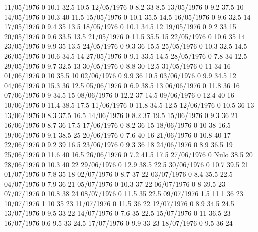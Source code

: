11/05/1976  0      10.1   32.5   10.5 
12/05/1976  0      8.2    33     8.5 
13/05/1976  0      9.2    37.5   10 
14/05/1976  0      10.3   40     11.5 
15/05/1976  0      10.1   35.5   14.5 
16/05/1976  0      9.6    32.5   14 
17/05/1976  0      9.4    35     13.5 
18/05/1976  0      10.1   34.5   12 
19/05/1976  0      9.2    33     15 
20/05/1976  0      9.6    33.5   13.5 
21/05/1976  0      11.5   35.5   15 
22/05/1976  0      10.6   35     14 
23/05/1976  0      9.9    35     13.5 
24/05/1976  0      9.3    36     15.5 
25/05/1976  0      10.3   32.5   14.5 
26/05/1976  0      10.6   34.5   14 
27/05/1976  0      9.1    33.5   14.5 
28/05/1976  0      7.8    34     12.5 
29/05/1976  0      9.7    32.5   13 
30/05/1976  0      8.8    30     12.5 
31/05/1976  0      11     34     16 
01/06/1976  0      10     35.5   10 
02/06/1976  0      9.9    36     10.5 
03/06/1976  0      9.9    34.5   12 
04/06/1976  0      15.3   36     12.5 
05/06/1976  0      6.9    38.5   13 
06/06/1976  0      11.8   36     16 
07/06/1976  0      9      34.5   15 
08/06/1976  0      12.2   37     14.5 
09/06/1976  0      12.4   40     16 
10/06/1976  0      11.4   38.5   17.5 
11/06/1976  0      11.8   34.5   12.5 
12/06/1976  0      10.5   36     13 
13/06/1976  0      8.3    37.5   16.5 
14/06/1976  0      8.2    37     19.5 
15/06/1976  0      9.3    36     21 
16/06/1976  0      8.7    36     17.5 
17/06/1976  0      8.2    36     15 
18/06/1976  0      10     38     16.5 
19/06/1976  0      9.1    38.5   25 
20/06/1976  0      7.6    40     16 
21/06/1976  0      10.8   40     17 
22/06/1976  0      9.2    39     16.5 
23/06/1976  0      9.3    36     18 
24/06/1976  0      8.9    36.5   19 
25/06/1976  0      11.6   40     16.5 
26/06/1976  0      7.2    41.5   17.5 
27/06/1976  0     Nulo    38.5   20 
28/06/1976  0      10.3   40     22 
29/06/1976  0      12.9   38.5   22.5 
30/06/1976  0      10.7   39.5   21 
01/07/1976  0      7.8    35     18 
02/07/1976  0      8.7    37     22 
03/07/1976  0      8.4    35.5   22.5 
04/07/1976  0      7.9    36     21 
05/07/1976  0      10.3   37     22 
06/07/1976  0      8      39.5   23 
07/07/1976  0      10.8   38     24 
08/07/1976  0      11.5   35     22.5 
09/07/1976  1.5    11.1   36     23 
10/07/1976  1      10     35     23 
11/07/1976  0      11.5   36     22 
12/07/1976  0      8.9    34.5   24.5 
13/07/1976  0      9.5    33     22 
14/07/1976  0      7.6    35     22.5 
15/07/1976  0      11     36.5   23 
16/07/1976  0.6    9.5    33     24.5 
17/07/1976  0      9.9    33     23 
18/07/1976  0      9.5    36     24 
